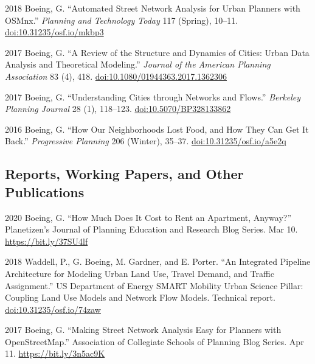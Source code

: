 \documentclass[12pt,letterpaper]{report}
\begin{document}
    \begin{tablist}

        \item[2018] \tab Boeing, G. \enquote{Automated Street Network Analysis for Urban Planners with OSMnx.} \textit{Planning and Technology Today} 117 (Spring), 10--11. \href{https://doi.org/10.31235/osf.io/mkbp3}{doi:10.31235/osf.io/mkbp3}

        \item[2017] \tab Boeing, G. \enquote{A Review of the Structure and Dynamics of Cities: Urban Data Analysis and Theoretical Modeling.} \textit{Journal of the American Planning Association} 83 (4), 418. \href{https://doi.org/10.1080/01944363.2017.1362306}{doi:10.1080/01944363.2017.1362306}

        \item[2017] \tab Boeing, G. \enquote{Understanding Cities through Networks and Flows.} \textit{Berkeley Planning Journal} 28 (1), 118--123. \href{https://doi.org/10.5070/BP328133862}{doi:10.5070/BP328133862}

        \item[2016] \tab Boeing, G. \enquote{How Our Neighborhoods Lost Food, and How They Can Get It Back.} \textit{Progressive Planning} 206 (Winter), 35--37. \href{https://doi.org/10.31235/osf.io/a5e2q}{doi:10.31235/osf.io/a5e2q}

    \end{tablist}



    \subsection*{Reports, Working Papers, and Other Publications}

    \begin{tablist}

        \item[2020] \tab Boeing, G. \enquote{How Much Does It Cost to Rent an Apartment, Anyway?} Planetizen's Journal of Planning Education and Research Blog Series. Mar 10. \href{https://bit.ly/37SU4lf}{https://bit.ly/37SU4lf}

        \item[2018] \tab Waddell, P., G. Boeing, M. Gardner, and E. Porter. \enquote{An Integrated Pipeline Architecture for Modeling Urban Land Use, Travel Demand, and Traffic Assignment.} US Department of Energy SMART Mobility Urban Science Pillar: Coupling Land Use Models and Network Flow Models. Technical report. \href{https://doi.org/10.31235/osf.io/74zaw}{doi:10.31235/osf.io/74zaw}

        \item[2017] \tab Boeing, G. \enquote{Making Street Network Analysis Easy for Planners with OpenStreetMap.} Association of Collegiate Schools of Planning Blog Series. Apr 11. \href{https://bit.ly/3n5ac9K}{https://bit.ly/3n5ac9K}

    \end{tablist}
\end{document}

